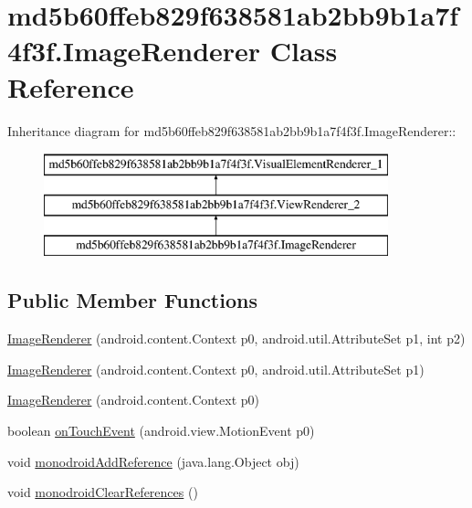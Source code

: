 \hypertarget{classmd5b60ffeb829f638581ab2bb9b1a7f4f3f_1_1_image_renderer}{
\section{md5b60ffeb829f638581ab2bb9b1a7f4f3f.ImageRenderer Class Reference}
\label{classmd5b60ffeb829f638581ab2bb9b1a7f4f3f_1_1_image_renderer}
}
Inheritance diagram for md5b60ffeb829f638581ab2bb9b1a7f4f3f.ImageRenderer::\begin{figure}[H]
\begin{center}
\leavevmode
\includegraphics[height=3cm]{classmd5b60ffeb829f638581ab2bb9b1a7f4f3f_1_1_image_renderer}
\end{center}
\end{figure}
\subsection*{Public Member Functions}
\begin{CompactItemize}
\item 
\hyperlink{classmd5b60ffeb829f638581ab2bb9b1a7f4f3f_1_1_image_renderer_c24ca6c41669583419378dbb5e462a2e}{ImageRenderer} (android.content.Context p0, android.util.AttributeSet p1, int p2)
\item 
\hyperlink{classmd5b60ffeb829f638581ab2bb9b1a7f4f3f_1_1_image_renderer_b5e414dafd0a921bee8ec84d29ab22e0}{ImageRenderer} (android.content.Context p0, android.util.AttributeSet p1)
\item 
\hyperlink{classmd5b60ffeb829f638581ab2bb9b1a7f4f3f_1_1_image_renderer_8333cb061f46b6e67de6bd4d64f2f84d}{ImageRenderer} (android.content.Context p0)
\item 
boolean \hyperlink{classmd5b60ffeb829f638581ab2bb9b1a7f4f3f_1_1_image_renderer_b69668a58532e4f57a389fa04e18015d}{onTouchEvent} (android.view.MotionEvent p0)
\item 
void \hyperlink{classmd5b60ffeb829f638581ab2bb9b1a7f4f3f_1_1_image_renderer_d03b188cd2a6839322ff08fe076796f9}{monodroidAddReference} (java.lang.Object obj)
\item 
void \hyperlink{classmd5b60ffeb829f638581ab2bb9b1a7f4f3f_1_1_image_renderer_4787f75a8b34aa5636dbd2a7df23c9bf}{monodroidClearReferences} ()
\end{CompactItemize}
